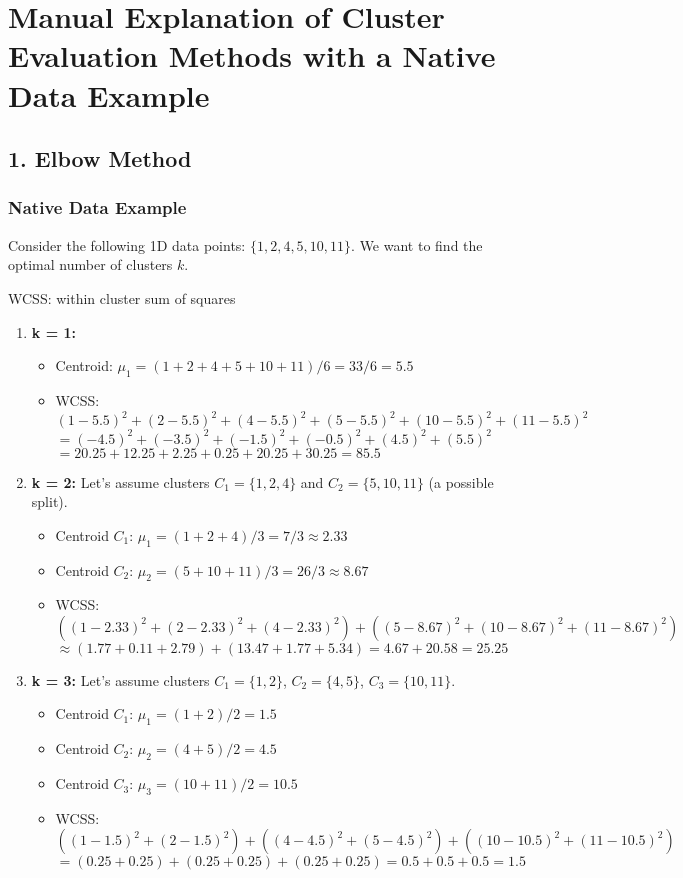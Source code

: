 \documentclass{article}
\begin{document}
\section*{Manual Explanation of Cluster Evaluation Methods with a Native Data Example}

\subsection*{1. Elbow Method}

\subsubsection*{Native Data Example}

Consider the following 1D data points: $\{1, 2, 4, 5, 10, 11\}$. We want to find the optimal number of clusters $k$.


WCSS: within cluster sum of squares

\begin{enumerate}
    \item \textbf{k = 1:}
    \begin{itemize}
        \item Centroid: $\mu_1 = (1+2+4+5+10+11)/6 = 33/6 = 5.5$
        \item WCSS: $(1-5.5)^2 + (2-5.5)^2 + (4-5.5)^2 + (5-5.5)^2 + (10-5.5)^2 + (11-5.5)^2$
        $= (-4.5)^2 + (-3.5)^2 + (-1.5)^2 + (-0.5)^2 + (4.5)^2 + (5.5)^2$
        $= 20.25 + 12.25 + 2.25 + 0.25 + 20.25 + 30.25 = 85.5$
    \end{itemize}
    \item \textbf{k = 2:} Let's assume clusters $C_1 = \{1, 2, 4\}$ and $C_2 = \{5, 10, 11\}$ (a possible split).
    \begin{itemize}
        \item Centroid $C_1$: $\mu_1 = (1+2+4)/3 = 7/3 \approx 2.33$
        \item Centroid $C_2$: $\mu_2 = (5+10+11)/3 = 26/3 \approx 8.67$
        \item WCSS: $((1-2.33)^2 + (2-2.33)^2 + (4-2.33)^2) + ((5-8.67)^2 + (10-8.67)^2 + (11-8.67)^2)$
        $\approx (1.77 + 0.11 + 2.79) + (13.47 + 1.77 + 5.34) = 4.67 + 20.58 = 25.25$
    \end{itemize}
    \item \textbf{k = 3:} Let's assume clusters $C_1 = \{1, 2\}$, $C_2 = \{4, 5\}$, $C_3 = \{10, 11\}$.
    \begin{itemize}
        \item Centroid $C_1$: $\mu_1 = (1+2)/2 = 1.5$
        \item Centroid $C_2$: $\mu_2 = (4+5)/2 = 4.5$
        \item Centroid $C_3$: $\mu_3 = (10+11)/2 = 10.5$
        \item WCSS: $((1-1.5)^2 + (2-1.5)^2) + ((4-4.5)^2 + (5-4.5)^2) + ((10-10.5)^2 + (11-10.5)^2)$
        $= (0.25 + 0.25) + (0.25 + 0.25) + (0.25 + 0.25) = 0.5 + 0.5 + 0.5 = 1.5$
    \end{itemize}
\end{enumerate}
\end{document}
